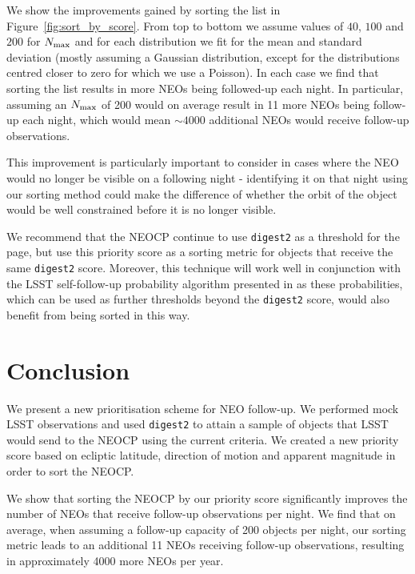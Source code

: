 \documentclass[twocolumn, twocolappendix]{aastex631}
\newcommand{\dig}{\texttt{digest2}}
\begin{document}
We show the improvements gained by sorting the list in Figure~\ref{fig:sort_by_score}. From top to bottom we assume values of $40$, $100$ and $200$ for $N_{\rm max}$ and for each distribution we fit for the mean and standard deviation (mostly assuming a Gaussian distribution, except for the distributions centred closer to zero for which we use a Poisson). In each case we find that sorting the list results in more NEOs being followed-up each night. In particular, assuming an $N_{\rm max}$ of 200 would on average result in 11 more NEOs being follow-up each night, which would mean ${\sim}4000$ additional NEOs would receive follow-up observations.

This improvement is particularly important to consider in cases where the NEO would no longer be visible on a following night - identifying it on that night using our sorting method could make the difference of whether the orbit of the object would be well constrained before it is no longer visible.

We recommend that the NEOCP continue to use \dig{} as a threshold for the page, but use this priority score as a sorting metric for objects that receive the same \dig{} score. Moreover, this technique will work well in conjunction with the LSST self-follow-up probability algorithm presented in \citep{sky-is-falling} as these probabilities, which can be used as further thresholds beyond the \dig{} score, would also benefit from being sorted in this way.

\section{Conclusion}

We present a new prioritisation scheme for NEO follow-up. We performed mock LSST observations and used \dig{} to attain a sample of objects that LSST would send to the NEOCP using the current criteria. We created a new priority score based on ecliptic latitude, direction of motion and apparent magnitude in order to sort the NEOCP.

We show that sorting the NEOCP by our priority score significantly improves the number of NEOs that receive follow-up observations per night. We find that on average, when assuming a follow-up capacity of 200 objects per night, our sorting metric leads to an additional 11 NEOs receiving follow-up observations, resulting in approximately 4000 more NEOs per year.


{}
\end{document}
